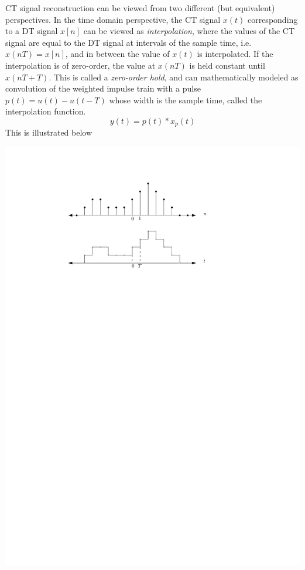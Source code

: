 CT signal reconstruction can be viewed from two different (but equivalent) perspectives. In the time domain perspective, the CT signal $x(t)$ corresponding to a DT signal $x[n]$ can be viewed as \emph{interpolation}, where the values of the CT signal are equal to the DT signal at intervals of the sample time, i.e. $x(nT) = x[n]$, and in between the value of $x(t)$ is interpolated. If the interpolation is of zero-order, the value at $x(nT)$ is held constant until $x(nT+T)$. This is called a \emph{zero-order hold}, and can mathematically modeled as convolution of the weighted impulse train with a pulse $p(t) = u(t) - u(t-T)$ whose width is the sample time, called the interpolation function.
\[
y(t) = p(t)*x_p(t)
\]
This is illustrated below
\begin{center}
  \includegraphics[scale=1]{graphics/zero-order-hold-interp.pdf}
\end{center}

